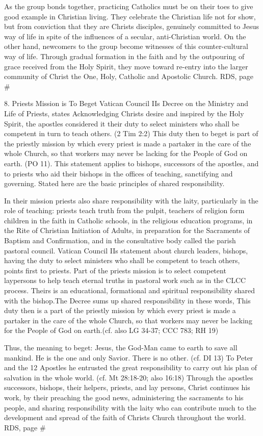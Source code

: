 \documentclass[oneside]{book}
\begin{document}
As the group bonds together, practicing Catholics must be on their toes to give
good example in Christian living. They celebrate the Christian life not for
show, but from conviction that they are Christs disciples, genuinely committed
to Jesus way of life in spite of the influences of a secular, anti-Christian
world. On the other hand, newcomers to the group become witnesses of this
counter-cultural way of life. Through gradual formation in the faith and by the
outpouring of grace received from the Holy Spirit, they move toward re-entry
into the larger community of Christ the One, Holy, Catholic and Apostolic
Church.  RDS, page \#

8. Priests Mission is To Beget Vatican Council IIs Decree on the Ministry and
Life of Priests, states Acknowledging Christs desire and inspired by the Holy
Spirit, the apostles considered it their duty to select ministers who shall be
competent in turn to teach others. (2 Tim 2:2) This duty then to beget is part
of the priestly mission by which every priest is made a partaker in the care of
the whole Church, so that workers may never be lacking for the People of God on
earth. (PO 11). This statement applies to bishops, successors of the apostles,
and to priests who aid their bishops in the offices of teaching, sanctifying and
governing. Stated here are the basic principles of shared responsibility.

In their mission priests also share responsibility with the laity, particularly
in the role of teaching: priests teach truth from the pulpit, teachers of
religion form children in the faith in Catholic schools, in the religious
education programs, in the Rite of Christian Initiation of Adults, in
preparation for the Sacraments of Baptism and Confirmation, and in the
consultative body called the parish pastoral council. Vatican Council IIs
statement about church leaders, bishops, having the duty to select ministers who
shall be competent to teach others, points first to priests. Part of the priests
mission is to select competent laypersons to help teach eternal truths in
pastoral work such as in the CLCC process. Theirs is an educational, formational
and spiritual responsibility shared with the bishop.The Decree sums up shared
responsibility in these words, This duty then is a part of the priestly mission
by which every priest is made a partaker in the care of the whole Church, so
that workers may never be lacking for the People of God on earth.(cf. also LG
34-37; CCC 783; RH 19)

Thus, the meaning to beget: Jesus, the God-Man came to earth to save all
mankind. He is the one and only Savior. There is no other. (cf. DI 13) To Peter
and the 12 Apostles he entrusted the great responsibility to carry out his plan
of salvation in the whole world. (cf. Mt 28:18-20; also 16:18) Through the
apostles successors, bishops, their helpers, priests, and lay persons, Christ
continues his work, by their preaching the good news, administering the
sacraments to his people, and sharing responsibility with the laity who can
contribute much to the development and spread of the faith of Christs Church
throughout the world.  RDS, page \#
\end{document}
